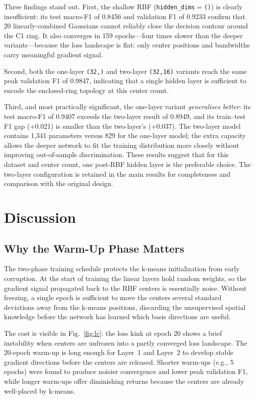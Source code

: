 \documentclass[conference]{IEEEtran}
\begin{document}
Three findings stand out.
First, the shallow RBF (\texttt{hidden\_dims}$=$\texttt{()}) is clearly
insufficient: its test macro-F1 of 0.8456 and validation F1 of 0.9233
confirm that 20 linearly-combined Gaussians cannot reliably close the
decision contour around the C1 ring.
It also converges in 159 epochs---four times slower than the deeper
variants---because the loss landscape is flat: only center positions and
bandwidths carry meaningful gradient signal.

Second, both the one-layer \texttt{(32,)} and two-layer \texttt{(32,16)}
variants reach the same peak validation F1 of 0.9847, indicating that
a single hidden layer is sufficient to encode the enclosed-ring topology
at this center count.

Third, and most practically significant, the one-layer variant
\emph{generalises better}: its test macro-F1 of 0.9407 exceeds the
two-layer result of 0.8949, and its train--test F1 gap (+0.021) is
smaller than the two-layer's (+0.037).
The two-layer model contains 1,341 parameters versus 829 for the
one-layer model; the extra capacity allows the deeper network to fit
the training distribution more closely without improving out-of-sample
discrimination.
These results suggest that for this dataset and center count, one
post-RBF hidden layer is the preferable choice.
The two-layer configuration is retained in the main results for
completeness and comparison with the original design.

\section{Discussion}
\label{sec:discussion}

\subsection{Why the Warm-Up Phase Matters}
The two-phase training schedule protects the k-means initialization from
early corruption.  At the start of training the linear layers hold random
weights, so the gradient signal propagated back to the RBF centers is
essentially noise.  Without freezing, a single epoch is sufficient to move
the centers several standard deviations away from the k-means positions,
discarding the unsupervised spatial knowledge before the network has learned
which basis directions are useful.

The cost is visible in Fig.~\ref{fig:lc}: the loss kink at epoch 20
shows a brief instability when centers are unfrozen into a partly converged
loss landscape.  The 20-epoch warm-up is long enough for Layer~1 and Layer~2
to develop stable gradient directions before the centers are released.
Shorter warm-ups (e.g., 5 epochs) were found to produce noisier convergence
and lower peak validation F1, while longer warm-ups offer diminishing returns
because the centers are already well-placed by k-means.
\end{document}
